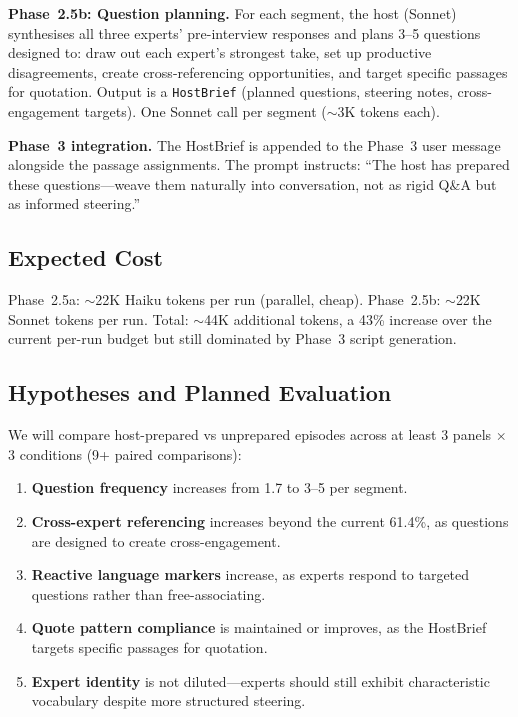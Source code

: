 \documentclass[final]{clv2025}
\begin{document}
\textbf{Phase~2.5b: Question planning.}  For each segment, the host
(Sonnet) synthesises all three experts' pre-interview responses and
plans 3--5 questions designed to: draw out each expert's strongest
take, set up productive disagreements, create cross-referencing
opportunities, and target specific passages for quotation.  Output is
a \texttt{HostBrief} (planned questions, steering notes,
cross-engagement targets).  One Sonnet call per segment ($\sim$3K
tokens each).

\textbf{Phase~3 integration.}  The HostBrief is appended to the
Phase~3 user message alongside the passage assignments.  The prompt
instructs: ``The host has prepared these questions---weave them
naturally into conversation, not as rigid Q\&A but as informed
steering.''

\subsection{Expected Cost}

Phase~2.5a: $\sim$22K Haiku tokens per run (parallel, cheap).
Phase~2.5b: $\sim$22K Sonnet tokens per run.  Total: $\sim$44K
additional tokens, a 43\% increase over the current per-run budget
but still dominated by Phase~3 script generation.

\subsection{Hypotheses and Planned Evaluation}

We will compare host-prepared vs unprepared episodes across at least 3
panels $\times$ 3 conditions (9+ paired comparisons):

\begin{enumerate}
\item \textbf{Question frequency} increases from 1.7 to 3--5 per
  segment.
\item \textbf{Cross-expert referencing} increases beyond the current
  61.4\%, as questions are designed to create cross-engagement.
\item \textbf{Reactive language markers} increase, as experts respond
  to targeted questions rather than free-associating.
\item \textbf{Quote pattern compliance} is maintained or improves, as
  the HostBrief targets specific passages for quotation.
\item \textbf{Expert identity} is not diluted---experts should still
  exhibit characteristic vocabulary despite more structured steering.
\end{enumerate}
\end{document}
